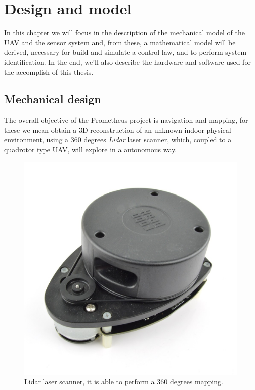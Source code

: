 \chapter{Design and model}
\label{designModel}

In this chapter we will focus in the description of the mechanical model of the UAV and the sensor system and, from these, a mathematical model will be derived, necessary for build and simulate a control law, and to perform system identification. In the end, we'll also describe the hardware and software used for the accomplish of this thesis.

\section{Mechanical design}
\label{mechanicalDesign}

The overall objective of the Prometheus project is navigation and mapping, for these we mean obtain a 3D reconstruction of an unknown indoor physical environment, using a 360 degrees \textit{Lidar} laser scanner, which, coupled to a quadrotor type UAV, will explore in a autonomous way. 

\begin{figure}
	\includegraphics[scale=0.21]{images/lidar_laser.jpg}
	\caption{Lidar laser scanner, it is able to perform a 360 degrees mapping.}
	\label{fig:lidar}
\end{figure}

